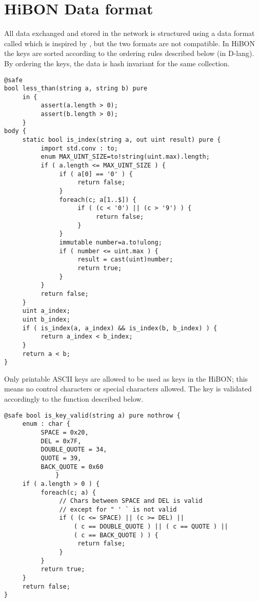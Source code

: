 \section{HiBON Data format}
\label{sec:hibon}
All data exchanged and stored in the network is structured using a data format called  which is inspired by , but the two formats are not compatible. In HiBON the keys are sorted according to the ordering rules described below (in D-lang). By ordering the keys, the data is hash invariant for the same collection.\\

\lstset{language=c++, numbers=left, numberstyle=\tiny, stepnumber=1, numbersep=5pt, tabsize=4}%
\begin{lstlisting}
@safe
bool less_than(string a, string b) pure
     in {
          assert(a.length > 0);
          assert(b.length > 0);
     }
body {
     static bool is_index(string a, out uint result) pure {
          import std.conv : to;
          enum MAX_UINT_SIZE=to!string(uint.max).length;
          if ( a.length <= MAX_UINT_SIZE ) {
               if ( a[0] == '0' ) {
                    return false;
               }
               foreach(c; a[1..$]) {
                    if ( (c < '0') || (c > '9') ) {
                         return false;
                    }
               }
               immutable number=a.to!ulong;
               if ( number <= uint.max ) {
                    result = cast(uint)number;
                    return true;
               }
          }
          return false;
     }
     uint a_index;
     uint b_index;
     if ( is_index(a, a_index) && is_index(b, b_index) ) {
          return a_index < b_index;
     }
     return a < b;
}
\end{lstlisting}

Only printable ASCII keys are allowed to be used as keys in the HiBON; this means no control characters or special characters allowed. The key is validated accordingly to the function described below.
\begin{lstlisting}
@safe bool is_key_valid(string a) pure nothrow {
     enum : char {
          SPACE = 0x20,
          DEL = 0x7F,
          DOUBLE_QUOTE = 34,
          QUOTE = 39,
          BACK_QUOTE = 0x60
              }
     if ( a.length > 0 ) {
          foreach(c; a) {
               // Chars between SPACE and DEL is valid
               // except for " ' ` is not valid
               if ( (c <= SPACE) || (c >= DEL) ||
                   ( c == DOUBLE_QUOTE ) || ( c == QUOTE ) ||
                   ( c == BACK_QUOTE ) ) {
                    return false;
               }
          }
          return true;
     }
     return false;
}
\end{lstlisting}


